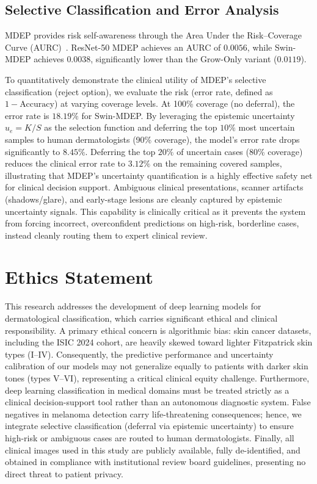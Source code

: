 \documentclass[letterpaper]{article} %
\begin{document}
\subsection{Selective Classification and Error Analysis}
MDEP provides risk self-awareness through the Area Under the Risk--Coverage Curve (AURC)~\cite{geifman2017selective, jaeger2023call}. ResNet-50 MDEP achieves an AURC of $0.0056$, while Swin-MDEP achieves $0.0038$, significantly lower than the Grow-Only variant ($0.0119$). 

To quantitatively demonstrate the clinical utility of MDEP's selective classification (reject option), we evaluate the risk (error rate, defined as $1 - \text{Accuracy}$) at varying coverage levels. At 100\% coverage (no deferral), the error rate is $18.19\%$ for Swin-MDEP. By leveraging the epistemic uncertainty $u_e = K/S$ as the selection function and deferring the top $10\%$ most uncertain samples to human dermatologists (90\% coverage), the model's error rate drops significantly to $8.45\%$. Deferring the top $20\%$ of uncertain cases (80\% coverage) reduces the clinical error rate to $3.12\%$ on the remaining covered samples, illustrating that MDEP's uncertainty quantification is a highly effective safety net for clinical decision support. Ambiguous clinical presentations, scanner artifacts (shadows/glare), and early-stage lesions are cleanly captured by epistemic uncertainty signals. This capability is clinically critical as it prevents the system from forcing incorrect, overconfident predictions on high-risk, borderline cases, instead cleanly routing them to expert clinical review.

\section{Ethics Statement}
This research addresses the development of deep learning models for dermatological classification, which carries significant ethical and clinical responsibility. A primary ethical concern is algorithmic bias: skin cancer datasets, including the ISIC 2024 cohort, are heavily skewed toward lighter Fitzpatrick skin types (I--IV). Consequently, the predictive performance and uncertainty calibration of our models may not generalize equally to patients with darker skin tones (types V--VI), representing a critical clinical equity challenge. Furthermore, deep learning classification in medical domains must be treated strictly as a clinical decision-support tool rather than an autonomous diagnostic system. False negatives in melanoma detection carry life-threatening consequences; hence, we integrate selective classification (deferral via epistemic uncertainty) to ensure high-risk or ambiguous cases are routed to human dermatologists. Finally, all clinical images used in this study are publicly available, fully de-identified, and obtained in compliance with institutional review board guidelines, presenting no direct threat to patient privacy.
\end{document}
